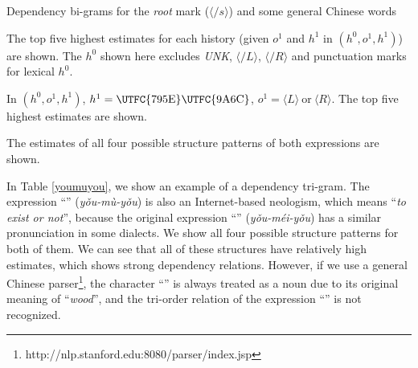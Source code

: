 \documentclass[english]{jnlp_1.4}
\begin{document}
\begin{table}[t]
\caption{Dependency bi-grams for the {\em root} mark ($\langle \slash s \rangle$) and some general Chinese words}
\label{general}

\vspace{4pt}\small
The top five highest estimates for each history (given $o^1$ and $h^1$ in $(h^0, o^1, h^1)$) are shown. The $h^0$ shown here excludes {\em UNK}, $\langle \slash L \rangle$, $\langle \slash R \rangle$ and punctuation marks for lexical $h^0$.
\par
\end{table}
\begin{table}[t]
\begin{minipage}[t]{210pt}
\setlength{\captionwidth}{210pt}
\label{shenma}

\vspace{4pt}\small
In $(h^0, o^1, h^1)$,  $h^1=\text{\UTFC{795E}\UTFC{9A6C}}$, $o^1 = \langle L \rangle\ \text{or}\  \langle R \rangle$. The top five highest estimates are shown.
\par
\end{minipage}
\hfill
\begin{minipage}[t]{190pt}
\setlength{\captionwidth}{190pt}
\label{youmuyou}

\vspace{4pt}\small
The estimates of all four possible structure patterns of both expressions are shown.
\par
\end{minipage}
\vspace{-0.5\Cvs}
\end{table}


In Table \ref{youmuyou}, we show an example of a dependency tri-gram. The expression ``'' ({\em y\v{o}u-m\`{u}-y\v{o}u}) is also an Internet-based neologism, which means ``{\em to exist or not}'', because the original expression ``'' ({\em y\v{o}u-m\'{e}i-y\v{o}u}) has a similar pronunciation in some dialects. We show all four possible structure patterns for both of them. We can see that all of these structures have relatively high estimates, which shows strong dependency relations. However, if we use a general Chinese parser\footnote{http://nlp.stanford.edu:8080/parser/index.jsp}\label{sfparser}, the character ``'' is always treated as a noun due to its original meaning of ``{\em wood}'', and the tri-order relation of the expression ``'' is not recognized. 
\end{document}
